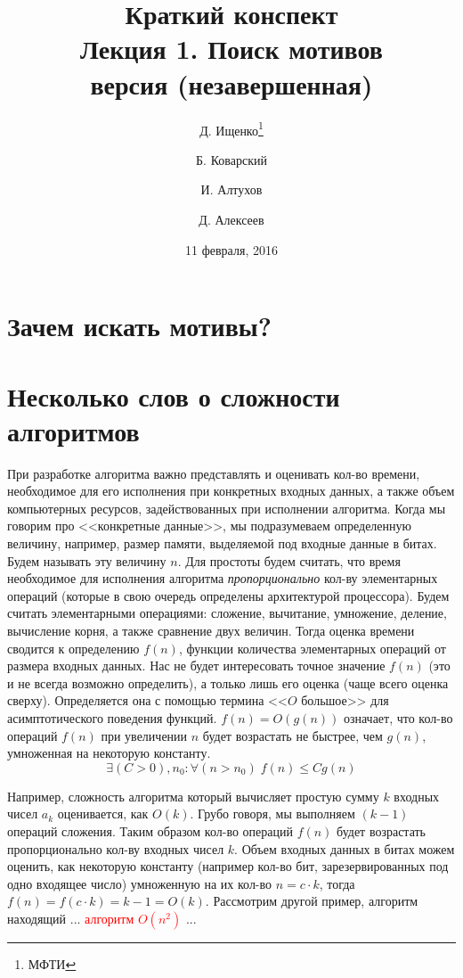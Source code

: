 \documentclass[letterpaper, 11pt]{article}
\title{\large{Краткий конспект}\\
\LARGE{Лекция 1. Поиск мотивов}\\
\normalsize версия \versionnumber (\textcolor{NavyBlue}{незавершенная})}
\date{11 февраля, 2016}
\author{Д. Ищенко\thanks{МФТИ} \and Б. Коварский\footnotemark[1]
\and И. Алтухов\footnotemark[1] \and Д. Алексеев\footnotemark[1]}
\begin{document}
\maketitle
\thispagestyle{empty}
\clearpage

\section{Зачем искать мотивы?}
\section{Несколько слов о сложности алгоритмов}
\par
При разработке алгоритма важно представлять и оценивать кол-во времени, 
необходимое для его исполнения при конкретных входных данных, а также объем компьютерных ресурсов,
задействованных при исполнении алгоритма. Когда мы говорим про <<конкретные данные>>, мы подразумеваем 
определенную величину, например, размер памяти, выделяемой под входные данные в битах. Будем называть эту
величину $n$. Для простоты будем считать, что время необходимое для исполнения алгоритма \textit{пропорционально}
кол-ву элементарных операций (которые в свою очередь определены архитектурой процессора). Будем считать
элементарными операциями: сложение, вычитание, умножение, деление, вычисление корня, а также сравнение двух величин. Тогда оценка 
времени сводится к определению $f(n)$, функции количества элементарных операций от размера входных данных. Нас не будет 
интересовать точное значение $f(n)$ (это и не всегда возможно определить), а только лишь его оценка (чаще всего оценка сверху). Определяется она с помощью термина <<$O$ большое>> для асимптотического поведения функций.
$f(n) = O(g(n))$ означает, что кол-во операций $f(n)$ при увеличении $n$ будет возрастать не быстрее, чем $g(n)$, умноженная на некоторую константу.
\[
\exists (C > 0), n_0 : \forall (n > n_0) \; f(n) \leq Cg(n)
\]
\par
Например, сложность алгоритма который вычисляет простую сумму $k$ входных чисел $a_k$ оценивается, как $O(k)$. Грубо говоря, мы выполняем $(k-1)$ операций сложения. Таким образом кол-во операций $f(n)$ будет возрастать пропорционально кол-ву входных чисел $k$. Объем входных данных в битах можем оценить, как некоторую константу (например кол-во бит, зарезервированных под одно входящее число) умноженную на их кол-во $n = c \cdot k$, тогда $f(n) = f(c \cdot k) = k - 1 = O(k)$. Рассмотрим другой пример, алгоритм находящий ... \textcolor{red}{алгоритм $O(n^2)$} ...
\par
\end{document}
